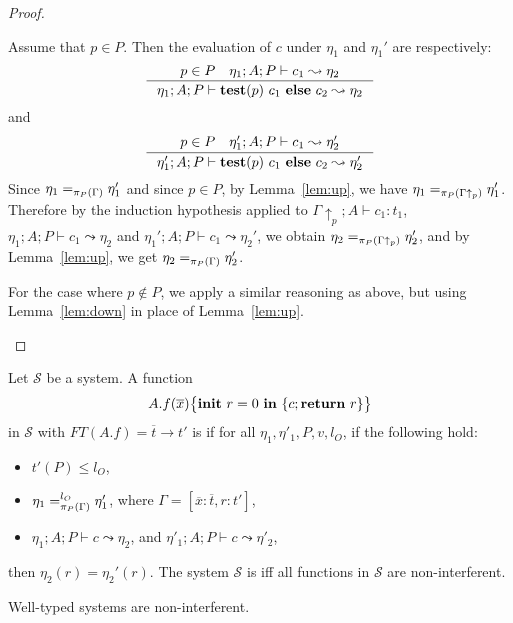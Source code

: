 {{{\begin{proof}
\begin{ProofEnumDesc}
Assume that $p \in P.$
Then the evaluation of $c$ under $\eta_1$ and $\eta_1'$
are respectively:
$$
\inference{p\in P \quad \eta_1; A; P \vdash c_1 \leadsto \eta_2}
{\eta_1; A ; P \vdash \lcCP{p}{c_1}{c_2} \leadsto \eta_2}
$$
and
$$
\inference
    {p\in P \quad \eta_1'; A; P \vdash c_1 \leadsto \eta_2'}
    {\eta_1'; A ; P \vdash \lcCP{p}{c_1}{c_2} \leadsto \eta_2'}
$$
Since $\eta_1 =_{\app{\Gamma}{P}} \eta_1'$ and since $p \in P$,
by Lemma~\ref{lem:up}, we have $\eta_1 =_{\app{\Gamma\uparrow_p}{P}} \eta_1'$.
Therefore by the induction hypothesis applied to $\Gamma\uparrow_p ; A \vdash c_1 : t_1$,
$\eta_1; A; P \vdash c_1 \leadsto \eta_2$ and
$\eta_1'; A; P \vdash c_1 \leadsto \eta_2'$, we obtain
$\eta_2 =_{\app{\Gamma\uparrow_p}{P}} \eta_2'$, and by Lemma~\ref{lem:up},
we get $\eta_2 =_{\app{\Gamma}{P}} \eta_2'$.

For the case where $p \not \in P$, we apply a similar reasoning as above,
but using Lemma~\ref{lem:down} in place of Lemma~\ref{lem:up}.
\end{ProofEnumDesc}
\end{proof}


\begin{definition}\label{def:sys-ni}
Let $\mathcal{S}$ be a system.
A function
$$\lpFUN{A.f}{\overline{x}}{c}$$
in $\mathcal{S}$
with $FT(A.f) = \overline{t} \rightarrow t'$
is {}
if for all $\eta_1, \eta'_1, P, v, l_{O}$,
if the following hold:
\begin{itemize}
\item $t'(P) \leq l_{O}$,
\item $\eta_1 =_{\app{\Gamma}{P}}^{l_{O}} \eta'_1$, where
$\Gamma = [\overline{x} : \overline{t}, r : t']$,
\item $\eta_1;A ; P\vdash c \leadsto \eta_2 $, and $\eta'_1; A; P\vdash c\leadsto \eta'_2 $,
\end{itemize}
then $\eta_2(r) = \eta_2'(r).$
The system $\mathcal{S}$ is  iff all functions
in $\mathcal{S}$ are non-interferent.
\end{definition}

\begin{theorem}\label{thm:ni}
Well-typed systems are non-interferent.
\end{theorem}



}}}
